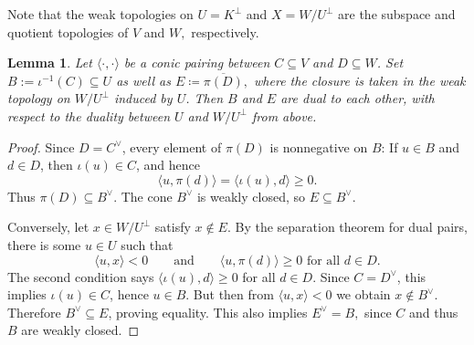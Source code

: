 \documentclass[11pt,onecolumn]{article}
\theoremstyle{plain}
\newtheorem{lemma}[lemma]{Lemma}
\theoremstyle{definition}
\begin{document}
Note that the weak topologies on $U=K^\perp$ and $X=W/U^\perp$  are the subspace and quotient topologies of $V$ and $W,$ respectively.

\begin{lemma}
\label{lem:dual}
    Let $\langle\cdot,\cdot\rangle$ be a conic pairing between $C\subseteq V$ and $D\subseteq W$.  Set $B:=\iota^{-1}(C)\subseteq U$ as well as $E\coloneqq\overline{\pi(D)},$ where the closure is taken in the weak topology on $W/U^\perp$ induced by $U$. Then $B$ and $E$ are dual to each other, with respect to the duality between $U$ and $W/U^\perp$ from above.
\end{lemma}
\begin{proof}
    Since $D=C^\vee$, every element of $\pi(D)$ is nonnegative on $B$: If $u\in B$ and $d\in D$, then $\iota(u)\in C$, and hence
    \[
        \langle u,\pi(d)\rangle=\langle\iota(u),d\rangle\geqslant 0.
    \]
    Thus $\pi(D)\subseteq B^\vee$.  The cone $B^\vee$ is weakly closed, so
    \(E\subseteq B^\vee\).

    Conversely, let $x\in W/U^\perp$ satisfy $x\notin E$.
    By the separation theorem for dual pairs, there is some $u\in U$ such that
    \[
        \langle u,x\rangle<0 \qquad\text{and}\qquad \langle u,\pi(d)\rangle\geqslant 0 \text{ for all } d\in D.
    \]
    The second condition says
    \(\langle\iota(u),d\rangle\geqslant 0\) for all $d\in D$.  Since $C=D^\vee$, this implies $\iota(u)\in C$, hence $u\in B$.  But then from 
    \(\langle u,x\rangle<0\) we obtain $x\notin B^\vee$.  
    Therefore $B^\vee\subseteq E$, proving equality. This also implies $E^\vee=B,$ since $C$ and thus $B$ are weakly closed.
\end{proof}
\end{document}
